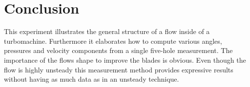 
\chapter{Conclusion}\label{sec:conclusion}

This experiment illustrates the general structure of a flow inside of a turbomachine. Furthermore it elaborates how to compute various angles, pressures and velocity components from a single five-hole measurement. The importance of the flows shape to improve the blades is obvious. Even though the flow is highly unsteady this measurement method provides expressive results without having as much data as in an unsteady technique.
